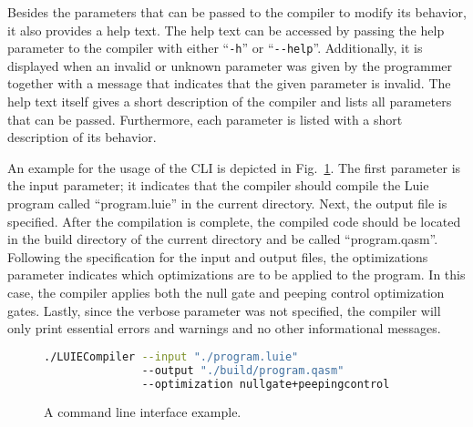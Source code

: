 Besides the parameters that can be passed to the compiler to modify its behavior, it also provides a help text. The help text can be accessed by passing the help parameter to the compiler with either ``\texttt{-h}'' or ``\texttt{-{}-help}''. Additionally, it is displayed when an invalid or unknown parameter was given by the programmer together with a message that indicates that the given parameter is invalid. The help text itself gives a short description of the compiler and lists all parameters that can be passed. Furthermore, each parameter is listed with a short description of its behavior.

An example for the usage of the CLI is depicted in Fig.~\ref{fig:concept_cli_example}. The first parameter is the input parameter; it indicates that the compiler should compile the Luie program called ``program.luie'' in the current directory. Next, the output file is specified. After the compilation is complete, the compiled code should be located in the build directory of the current directory and be called ``program.qasm''. Following the specification for the input and output files, the optimizations parameter indicates which optimizations are to be applied to the program. In this case, the compiler applies both the null gate and peeping control optimization gates. Lastly, since the verbose parameter was not specified, the compiler will only print essential errors and warnings and no other informational messages.
\begin{figure}[htp]
    \centering
    \begin{lstlisting}[language=bash, style=bashstyle]
./LUIECompiler --input "./program.luie" 
               --output "./build/program.qasm" 
               --optimization nullgate+peepingcontrol
    \end{lstlisting}
    \caption{A command line interface example.}
    \label{fig:concept_cli_example}
\end{figure}